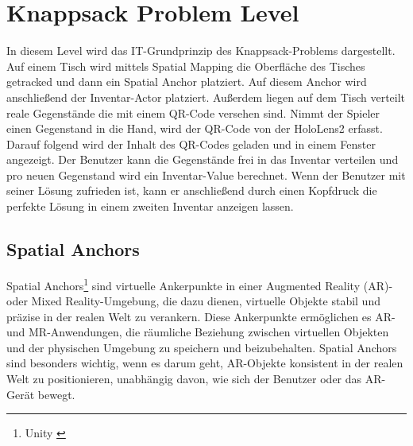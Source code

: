 \section{Knappsack Problem Level}
In diesem Level wird das IT-Grundprinzip des Knappsack-Problems dargestellt.
Auf einem Tisch wird mittels Spatial Mapping die Oberfläche des Tisches
getracked und dann ein Spatial Anchor platziert. Auf diesem Anchor wird
anschließend der Inventar-Actor platziert. Außerdem liegen auf dem Tisch
verteilt reale Gegenstände die mit einem QR-Code versehen sind. Nimmt der
Spieler einen Gegenstand in die Hand, wird der QR-Code von der HoloLens2
erfasst. Darauf folgend wird der Inhalt des QR-Codes geladen und in einem
Fenster angezeigt. Der Benutzer kann die Gegenstände frei in das Inventar
verteilen und pro neuen Gegenstand wird ein Inventar-Value berechnet.
Wenn der Benutzer mit seiner Lösung zufrieden ist, kann er anschließend
durch einen Kopfdruck die perfekte Lösung in einem zweiten Inventar anzeigen
lassen.

\subsection{Spatial Anchors}
Spatial Anchors\footnote{Unity \cite{Anchor}} sind virtuelle Ankerpunkte in einer Augmented Reality (AR)- oder Mixed Reality-Umgebung, die dazu dienen,
virtuelle Objekte stabil und präzise in der realen Welt zu verankern. Diese Ankerpunkte ermöglichen es AR- und
MR-Anwendungen, die räumliche Beziehung zwischen virtuellen Objekten und der physischen Umgebung zu speichern und
beizubehalten. Spatial Anchors sind besonders wichtig, wenn es darum geht, AR-Objekte konsistent in der realen Welt
zu positionieren, unabhängig davon, wie sich der Benutzer oder das AR-Gerät bewegt.

